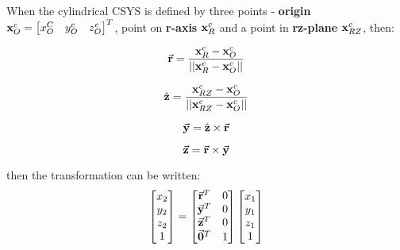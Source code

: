 \begin{enumerate}
        When the cylindrical CSYS is defined by three points - \textbf{origin}
         $ \mathbf{x}_O^c = \begin{bmatrix} x_O^C & y_O^c & z_O^c \end{bmatrix}^T $,
         point on \textbf{r-axis} $ \mathbf{x}_{R}^c $
        and a point in \textbf{rz-plane} $ \mathbf{x}_{RZ}^c $, then:

        \begin{equation}
            \vec{\mathbf{r}} = \frac{\mathbf{x}_R^c - \mathbf{x}_O^c}{||\mathbf{x}_R^c - \mathbf{x}_O^c||}
        \end{equation}

        \begin{equation}
            \hat{\mathbf{z}} = \frac{\mathbf{x}_{RZ}^c - \mathbf{x}_O^c}{||\mathbf{x}_{RZ}^c - \mathbf{x}_O^c||}
        \end{equation}

        \begin{equation}
            \vec{\mathbf{y}} = \hat{\mathbf{z}} \times \vec{\mathbf{r}}
        \end{equation}

        \begin{equation}
            \vec{\mathbf{z}} = \vec{\mathbf{r}} \times \vec{\mathbf{y}}
        \end{equation}

        then the transformation can be written:
        \begin{equation}
            \begin{bmatrix}
                x_2 \\
                y_2 \\
                z_2 \\
                1 \\
            \end{bmatrix}
            = \begin{bmatrix}
                \vec{\mathbf{r}}^T & 0 \\
                \vec{\mathbf{y}}^T & 0 \\
                \vec{\mathbf{z}}^T & 0 \\
                \vec{\mathbf{0}}^T & 1 \\
            \end{bmatrix}
            \begin{bmatrix}
                x_1 \\
                y_1 \\
                z_1 \\
                1 \\
            \end{bmatrix}
        \end{equation}


\end{enumerate}
